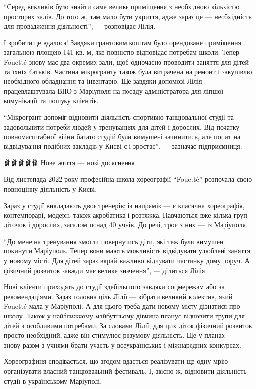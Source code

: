 \enquote{Серед викликів було знайти саме велике приміщення з необхідною кількістю
просторих залів. До того ж, там мало бути укриття, адже зараз це — необхідність
для провадження діяльності}, — розповідає Лілія.

І зробити це вдалося! Завдяки грантовим коштам було орендоване приміщення
загальною площею 141 кв. м, яке повністю відповідає потребам школи. Тепер
Fouetté знову має два окремих зали, щоб одночасно проводити заняття для дітей
та їхніх батьків. Частина мікрогранту також була витрачена на ремонт і
закупівлю необхідного обладнання та інвентарю. Ще завдяки допомозі Лілія
працевлаштувала ВПО з Маріуполя на посаду адміністратора для ліпшої комунікації
та пошуку клієнтів.

\enquote{Мікрогрант допоміг відновити діяльність спортивно-танцювальної студії та
задовольнити потреби людей у тренуваннях для дітей і дорослих. Від початку
повномасштабної війни багато студій були вимушені зачинитись, але попит на
відвідування подібних закладів у Києві є і зростає}, — зазначає підприємниця.

🩰🩰🩰🩰🩰 Нове життя — нові досягнення

Від листопада 2022 року професійна школа хореографії \enquote{Fouetté}
розпочала свою повноцінну діяльність у Києві. 

Зараз у студії викладають двоє тренерів; із напрямів — є класична хореографія,
контемпорарі, модерн, також акробатика і розтяжка. Навчаються вже кілька груп
діточок і дорослих, загалом понад 40 учнів. До речі, троє з них — із Маріуполя.

\enquote{До мене на тренування змогли повернутись діти, які теж були вимушені покинути
Маріуполь. Тепер вони мають можливість відвідувати улюблені заняття у новому
місті. Для дітей зараз вкрай важливо відчувати частинку дому поруч. А фізичний
розвиток завжди має велике значення}, — ділиться Лілія.

Нові клієнти приходять до студії здебільшого завдяки соцмережам або за
рекомендаціями. Зараз головна ціль Лілії — зібрати великий колектив, який
Fouetté мала у Маріуполі. А для цього треба дати новому місту дізнатися про
школу. Також у найближчому майбутньому дівчина планує відновити групи для дітей
з особливими потребами. За словами Лілії, для цих діток фізичний розвиток
просто необхідний, адже він стимулює розумову діяльність. Ще у планах — знову
разом з учнями брати участь у всеукраїнських і міжнародних конкурсах.

Хореографиня сподівається, що згодом вдасться реалізувати ще одну мрію —
організувати власний танцювальний фестиваль. І, звісно ж, відновити діяльність
студії в українському Маріуполі.

